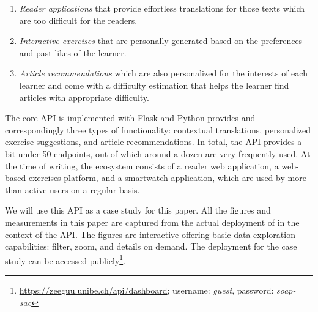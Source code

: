   \begin{enumerate}

    \item \textit{Reader applications} that provide effortless translations for those texts which are too difficult for the readers.

    \item \textit{Interactive exercises} that are personally generated based on the preferences and past likes of the learner.

    \item \textit{Article recommendations} which are also personalized for the interests of each learner and come with a difficulty estimation that helps the learner find articles with appropriate difficulty.

  \end{enumerate}

  The core API is implemented with Flask and Python provides and correspondingly three types of functionality: contextual translations, personalized exercise suggestions, and article recommendations. In total, the API provides a bit under 50 endpoints, out of which around a dozen are very frequently used. 
  At the time of writing, the ecosystem consists of a reader web application, a web-based exercises platform, and a smartwatch application, which are used by more than \activeUserCount active users on a regular basis. 


  
  We will use this \zee API as a case study for this paper. 
  All the figures and measurements in this paper are captured from the actual deployment of \tool in the context of the \zee API. The figures are interactive offering basic data exploration capabilities: filter, zoom, and details on demand\cite{Shne99a}. The \tool deployment for the case study can be accessed publicly\footnote{\url{https://zeeguu.unibe.ch/api/dashboard}; username: {\em guest}, password: {\em soap-sac}}. 



